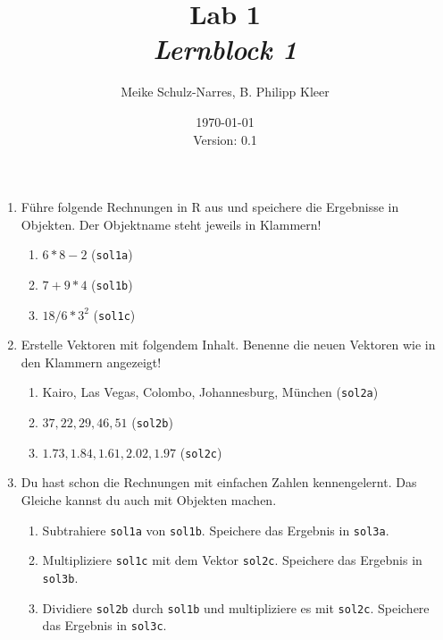 \documentclass[12pt,a4paper]{article}
\title{Lab 1 \\ \normalsize \textit{Lernblock 1}}
\author{Meike Schulz-Narres, B. Philipp Kleer}
\date{\today \\ \small{Version: 0.1}}
\begin{document}
\maketitle

\begin{enumerate}
	\item Führe folgende Rechnungen in R aus und speichere die Ergebnisse in Objekten. Der Objektname steht jeweils in Klammern!
	\begin{enumerate}
		\item $6 * 8 - 2$ (\texttt{sol1a})
		\item $7 + 9 * 4$ (\texttt{sol1b})
		\item $18 / 6 * 3^2$ (\texttt{sol1c})
	\end{enumerate}
	\item Erstelle Vektoren mit folgendem Inhalt. Benenne die neuen Vektoren wie in den Klammern angezeigt!
	\begin{enumerate}
		\item Kairo, Las Vegas, Colombo, Johannesburg, München (\texttt{sol2a})
		\item $37, 22, 29, 46, 51$ (\texttt{sol2b})
		\item $1.73, 1.84, 1.61, 2.02, 1.97$ (\texttt{sol2c})
	\end{enumerate}
	\item Du hast schon die Rechnungen mit einfachen Zahlen kennengelernt. Das Gleiche kannst du auch mit Objekten machen.
	\begin{enumerate}
		\item Subtrahiere \texttt{sol1a} von \texttt{sol1b}. Speichere das Ergebnis in \texttt{sol3a}.
		\item Multipliziere \texttt{sol1c} mit dem Vektor \texttt{sol2c}. Speichere das Ergebnis in \texttt{sol3b}.
		\item Dividiere \texttt{sol2b} durch \texttt{sol1b} und multipliziere es mit \texttt{sol2c}. Speichere das Ergebnis in \texttt{sol3c}.
	\end{enumerate}
\end{enumerate}
\end{document}

